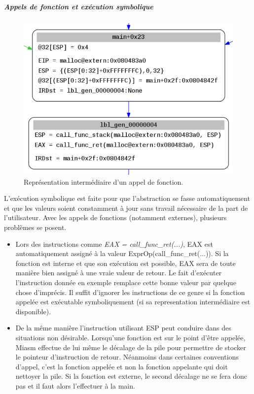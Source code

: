 \subparagraph{Appels de fonction et exécution symbolique}
\begin{figure}[h]
    \centering
    \includegraphics[scale=0.3]{images/ir.png}\newline
    \caption{Représentation intermédiaire d'un appel de fonction.}
\end{figure}
L'exécution symbolique est faite pour que l'abstraction se fasse automatiquement et que les valeurs soient constamment à jour sans travail nécessaire de la part de l'utilisateur. Avec les appels de
fonctions (notamment externes), plusieurs problèmes se posent.
\begin{itemize}
    \item Lors des instructions comme \textit{EAX = call\_func\_ret(...)}, EAX est automatiquement assigné à la valeur ExprOp(call\_func\_ret(...)). Si la fonction est interne et que
    son exécution est possible, EAX sera de toute manière bien assigné à une vraie valeur de retour. Le fait d'exécuter l'instruction donnée en exemple remplace cette bonne valeur par quelque
    chose d'imprécis.\newline
    Il suffit d'ignorer les instructions de ce genre si la fonction appelée est exécutable symboliquement (si sa representation intermédiaire est disponible).
    \item De la même manière l'instruction utilisant ESP peut conduire dans des situations non désirable. Lorsqu'une fonction est sur le point d'être appelée, Miasm effectue de lui même le décalage de la pile pour permettre de stocker le pointeur d'instruction de retour.\newline
    Néanmoins dans certaines conventions d'appel, c'est la fonction appelée et non la fonction appelante qui doit nettoyer la pile. Si la fonction est externe, le second décalage ne se fera donc pas et il faut alors l'effectuer à la main.
\end{itemize}

